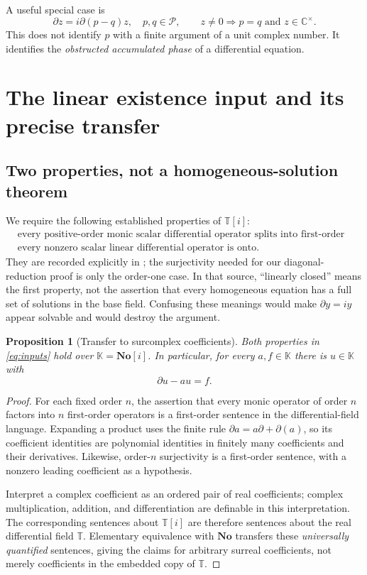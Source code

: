 \documentclass[11pt,a4paper]{article}
\numberwithin{equation}{section}
\newtheorem{proposition}[proposition]{Proposition}
\theoremstyle{definition}
\theoremstyle{remark}
\newcommand{\No}{\mathbf{No}}
\newcommand{\K}{\mathbb K}
\newcommand{\C}{\mathbb C}
\newcommand{\T}{\mathbb T}
\newcommand{\PP}{\mathcal P}
\begin{document}
A useful special case is
\begin{equation}\label{eq:phase-no-solution}
 \partial z=i\partial(p-q)z,
 \quad p,q\in\PP,
 \qquad
 z\ne0\Longrightarrow p=q\text{ and }z\in\C^\times.
\end{equation}
This does not identify $p$ with a finite argument of a unit complex number.
It identifies the \emph{obstructed accumulated phase} of a differential
equation.

\section{The linear existence input and its precise transfer}\label{sec:existence}

\subsection{Two properties, not a homogeneous-solution theorem}
We require the following established properties of $\T[i]$:
\begin{equation}\label{eq:inputs}
 \begin{split}
 &\text{every positive-order monic scalar differential operator splits into
 first-order factors;}\\
 &\text{every nonzero scalar linear differential operator is onto.}
 \end{split}
\end{equation}
They are recorded explicitly in \cite[Lemma 2.4.19]{ADHNorm}; the
surjectivity needed for our diagonal-reduction proof is only the order-one
case. In that source, ``linearly closed'' means the first property, not the
assertion that every homogeneous equation has a full set of solutions in
the base field. Confusing these meanings would make $\partial y=iy$
appear solvable and would destroy the argument.

\begin{proposition}[Transfer to surcomplex coefficients]\label{prop:transfer}
Both properties in \eqref{eq:inputs} hold over $\K=\No[i]$. In particular,
for every $a,f\in\K$ there is $u\in\K$ with
\[
 \partial u-au=f.
\]
\end{proposition}
\begin{proof}
For each fixed order $n$, the assertion that every monic operator of order
$n$ factors into $n$ first-order operators is a first-order sentence in the
differential-field language. Expanding a product uses the finite rule
$\partial a=a\partial+\partial(a)$, so its coefficient identities are
polynomial identities in finitely many coefficients and their derivatives.
Likewise, order-$n$ surjectivity is a first-order sentence, with a nonzero
leading coefficient as a hypothesis.

Interpret a complex coefficient as an ordered pair of real coefficients;
complex multiplication, addition, and differentiation are definable in this
interpretation. The corresponding sentences about $\T[i]$ are therefore
sentences about the real differential field $\T$. Elementary equivalence
with $\No$ transfers these \emph{universally quantified} sentences, giving
the claims for arbitrary surreal coefficients, not merely coefficients in
the embedded copy of $\T$.
\end{proof}
\end{document}
